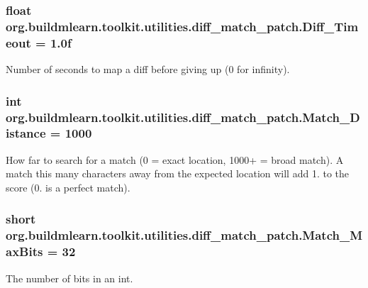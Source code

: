 \subsubsection[{\texorpdfstring{Diff\+\_\+\+Timeout}{Diff_Timeout}}]{\setlength{\rightskip}{0pt plus 5cm}float org.\+buildmlearn.\+toolkit.\+utilities.\+diff\+\_\+match\+\_\+patch.\+Diff\+\_\+\+Timeout = 1.\+0f}\hypertarget{classorg_1_1buildmlearn_1_1toolkit_1_1utilities_1_1diff__match__patch_a371b7d83d00f5e5f156f04a9b6337d1a}{}\label{classorg_1_1buildmlearn_1_1toolkit_1_1utilities_1_1diff__match__patch_a371b7d83d00f5e5f156f04a9b6337d1a}
Number of seconds to map a diff before giving up (0 for infinity). 
\subsubsection[{\texorpdfstring{Match\+\_\+\+Distance}{Match_Distance}}]{\setlength{\rightskip}{0pt plus 5cm}int org.\+buildmlearn.\+toolkit.\+utilities.\+diff\+\_\+match\+\_\+patch.\+Match\+\_\+\+Distance = 1000}\hypertarget{classorg_1_1buildmlearn_1_1toolkit_1_1utilities_1_1diff__match__patch_aeec342cc294a0c3795d631ee1550a0da}{}\label{classorg_1_1buildmlearn_1_1toolkit_1_1utilities_1_1diff__match__patch_aeec342cc294a0c3795d631ee1550a0da}
How far to search for a match (0 = exact location, 1000+ = broad match). A match this many characters away from the expected location will add 1. to the score (0. is a perfect match). 
\subsubsection[{\texorpdfstring{Match\+\_\+\+Max\+Bits}{Match_MaxBits}}]{\setlength{\rightskip}{0pt plus 5cm}short org.\+buildmlearn.\+toolkit.\+utilities.\+diff\+\_\+match\+\_\+patch.\+Match\+\_\+\+Max\+Bits = 32\hspace{0.3cm}{\ttfamily [private]}}\hypertarget{classorg_1_1buildmlearn_1_1toolkit_1_1utilities_1_1diff__match__patch_acbd6579dfcc52cec95ac2e657d068e74}{}\label{classorg_1_1buildmlearn_1_1toolkit_1_1utilities_1_1diff__match__patch_acbd6579dfcc52cec95ac2e657d068e74}
The number of bits in an int. 

